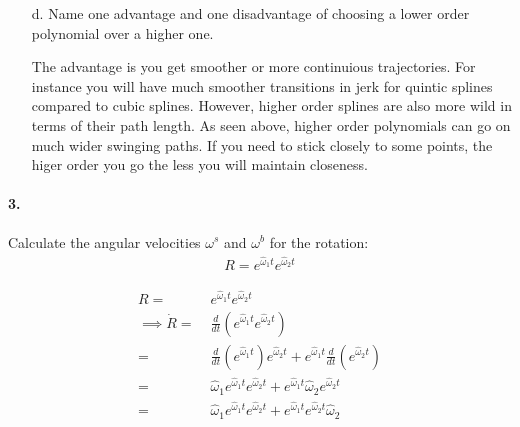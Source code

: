 \documentclass[english]{article}
\begin{document}
\begin{enumerate}
\item[d.] Name one advantage and one disadvantage of choosing a lower order polynomial over a higher one.  

The advantage is you get smoother or more continuious trajectories. For instance you will have much smoother transitions in jerk for quintic splines compared
 to cubic splines. However, higher order splines are also more wild in terms of their path length. As seen above, higher order polynomials can go on much
 wider swinging paths. If you need to stick closely to some points, the higer order you go the less you will maintain closeness.
 
\end{enumerate}

\paragraph{3.}

Calculate the angular velocities $\omega^s$ and $\omega^b$ for the rotation:
\begin{align}
R = e^{\hat{\omega}_1 t} e^{\hat{\omega}_2 t}
\end{align}

\begin{align*}
               R = &\;  e^{\hat{\omega}_1 t} e^{\hat{\omega}_2 t} \\
\implies \dot{R} = &\; \frac{d}{dt}(e^{\hat{\omega}_1 t} e^{\hat{\omega}_2 t}) \\
  = &\; \frac{d}{dt}(e^{\hat{\omega}_1 t}) e^{\hat{\omega}_2 t} + e^{\hat{\omega}_1 t} \frac{d}{dt}(e^{\hat{\omega}_2 t}) \\
  = &\; \hat{\omega}_1 e^{\hat{\omega}_1 t} e^{\hat{\omega}_2 t} + e^{\hat{\omega}_1 t} \hat{\omega}_2 e^{\hat{\omega}_2 t} \\
  = &\; \hat{\omega}_1 e^{\hat{\omega}_1 t} e^{\hat{\omega}_2 t} + e^{\hat{\omega}_1 t} e^{\hat{\omega}_2 t} \hat{\omega}_2 \\
\end{align*}
\end{document}
